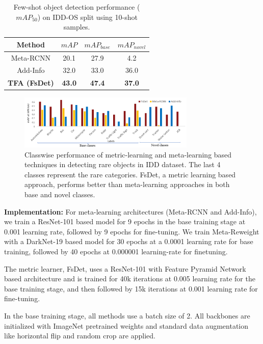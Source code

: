 \documentclass[letterpaper]{article} %
\begin{document}
\begin{table}[t]
      \caption{Few-shot object detection performance ($mAP_{50}$) on IDD-OS split using 10-shot samples.}
      \centering
      \begin{tabular}{c|c|c|c}
            \hline
            Method                   & $mAP$  & $mAP_{base}$ & $mAP_{novel}$ \\
            \hline
            Meta-RCNN & 20.1 & 27.9         & 4.2           \\
            Add-Info  & 32.0 & 33.0         & 36.0          \\
            \textbf{TFA (FsDet)} & \textbf{43.0} & \textbf{47.4} & \textbf{37.0}          \\
            \hline
      \end{tabular}
      \label{table4}
\end{table}

\begin{figure}[t]
      \centering
      \includegraphics[height=0.19\textwidth,width=0.75\textwidth]{accuracy_vfb.PNG}
      \caption{Classwise performance of metric-learning and meta-learning based techniques in detecting rare objects in IDD dataset. The last 4 classes represent the rare categories. FsDet, a metric learning based approach, performs better than meta-learning approaches in both base and novel classes.}
      \label{vfb_classwise}
\end{figure}

\textbf{Implementation: } 
For meta-learning architectures (Meta-RCNN and Add-Info), we train a ResNet-101 based model for 9 epochs in the base training stage at 0.001 learning rate, followed by 9 epochs for fine-tuning. We train Meta-Reweight with a DarkNet-19 based model for 30 epochs at a 0.0001 learning rate for base training, followed by 40 epochs at 0.000001 learning-rate for finetuning.

The metric learner, FsDet, uses a ResNet-101 with Feature Pyramid Network based architecture and is trained for 40k iterations at 0.005 learning rate for the base training stage, and then followed by 15k iterations at 0.001 learning rate for fine-tuning. 

In the base training stage, all methods use a batch size of 2. All backbones are initialized with ImageNet pretrained weights and standard data augmentation like horizontal flip and random crop are applied. 
\end{document}
